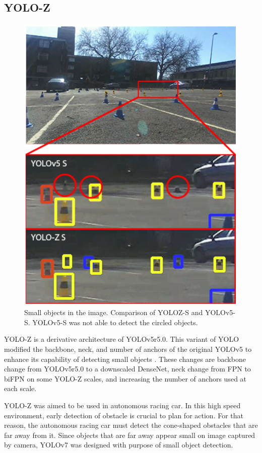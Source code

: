   \subsection{YOLO-Z}
  \begin{figure}[H]
    \centering
    \includegraphics[width=.4\textwidth]{figures/yoloz-result.png}
    \caption{Small objects in the image. Comparison of YOLOZ-S and YOLOv5-S. YOLOv5-S was not able to detect the circled objects.}
    \label{fig:yolozcone}
  \end{figure}
  YOLO-Z is a derivative architecture of YOLOv5r5.0.
  This variant of YOLO modified the backbone, neck, and number of anchors of the original YOLOv5 to 
  enhance its capability of detecting small objects \parencite{yoloz}.
  These changes are backbone change from YOLOv5r5.0 to a downscaled DenseNet,
  neck change from FPN to biFPN on some YOLO-Z scales, and increasing the number of anchors used at each scale.

  YOLO-Z was aimed to be used in autonomous racing car. In this high speed environment, early detection
  of obstacle is crucial to plan for action. For that reason, the autonomous racing car must detect the cone-shaped obstacles
  that are far away from it. Since objects that are far away appear small on image captured by camera, YOLOv7 was designed with
  purpose of small object detection.


